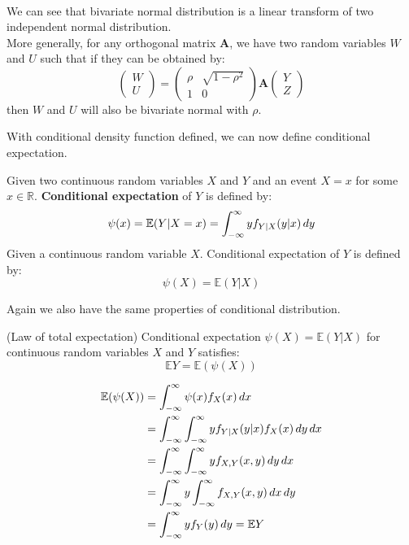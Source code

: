 \documentclass{huhtakm-template-book}
\newcommand{\expect}{\mathbb{E}}
\begin{document}
\begin{eg}
\begin{align*}
        \end{align*}
        We can see that bivariate normal distribution is a linear transform of two independent normal distribution.\\
        More generally, for any orthogonal matrix $\mathbf{A}$, we have two random variables $W$ and $U$ such that if they can be obtained by:
        \begin{equation*}
            \begin{pmatrix}
                W\\
                U
            \end{pmatrix}=\begin{pmatrix}
                \rho & \sqrt{1-\rho^{2}}\\
                1 & 0
            \end{pmatrix}\mathbf{A}\begin{pmatrix}
                Y\\
                Z
            \end{pmatrix}
        \end{equation*}
        then $W$ and $U$ will also be bivariate normal with $\rho$.
    \end{eg}
    With conditional density function defined, we can now define conditional expectation.
    \begin{defn}
        Given two continuous random variables $X$ and $Y$ and an event $X=x$ for some $x\in\mathbb{R}$. \textbf{Conditional expectation} of $Y$ is defined by:
        \begin{equation*}
            \psi(x)=\expect(Y|X=x)=\intinfty yf_{Y|X}(y|x)\,dy
        \end{equation*}
        Given a continuous random variable $X$. Conditional expectation of $Y$ is defined by:
        \begin{equation*}
            \psi(X)=\expect(Y|X)
        \end{equation*}
    \end{defn}
    Again we also have the same properties of conditional distribution.
    \begin{lem}(Law of total expectation) 
        Conditional expectation $\psi(X)=\expect(Y|X)$ for continuous random variables $X$ and $Y$ satisfies:
        \begin{equation*}
            \expect Y=\expect(\psi(X))
        \end{equation*}
    \end{lem}
    \begin{proofing}
        \begin{align*}
            \expect(\psi(X))&=\intinfty\psi(x)f_{X}(x)\,dx\\
            &=\intinfty\intinfty yf_{Y|X}(y|x)f_{X}(x)\,dy\,dx\\
            &=\intinfty\intinfty yf_{X,Y}(x,y)\,dy\,dx\\
            &=\intinfty y\intinfty f_{X,Y}(x,y)\,dx\,dy\\
            &=\intinfty yf_{Y}(y)\,dy=\expect Y
        \end{align*}
    \end{proofing}
\end{document}
